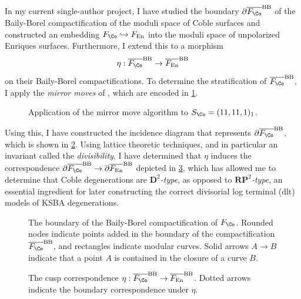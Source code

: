 \documentclass{amsart}
\begin{document}
\begin{remark}

In my current single-author project, I have studied the boundary \(\partial \overline{ F_{\Co} }^{\operatorname{BB}}\) of the Baily-Borel compactification of the moduli space of Coble surfaces and constructed an embedding \(F_{\Co}\hookrightarrow F_{\operatorname{En}}\) into the moduli space of unpolarized Enriques surfaces. Furthermore, I extend this to a morphism \[
\eta: \overline{ F_{\Co} }^{\operatorname{BB}} \to \overline{ F_{\operatorname{En}} }^{\operatorname{BB}}
\] on their Baily-Borel compactifications. To determine the stratification of \(\overline{ F_{\Co} }^{\operatorname{BB}}\), I apply the \emph{mirror moves} of \cite{AE22}, which are encoded in \cref{fig:mirror-moves-coble-simplified-tikz}.

\begin{figure}[H]
\centering

\caption{Application of the mirror move algorithm to $S_{\Co} = (11, 11, 1)_1$.}
\label{fig:mirror-moves-coble-simplified-tikz}
\end{figure}

Using this, I have constructed the incidence diagram that represents \(\partial \overline{ F_{\Co} }^{\operatorname{BB}}\), which is shown in \cref{fig:coble-cusp-diagram-detailed}. Using lattice theoretic techniques, and in particular an invariant called the \emph{divisibility}, I have determined that \(\eta\) induces the correspondence \(\partial \overline{ F_{\Co} }^{\operatorname{BB}}\to \partial \overline{ F_{\operatorname{En}} }^{\operatorname{BB}}\) depicted in \cref{fig:enriques-coble-correspondence}, which has allowed me to determine that Coble degenerations are \emph{\(\mathbf{D}^2\)-type}, as opposed to \emph{\({\mathbf{RP}}^2\)-type}, an essential ingredient for later constructing the correct divisorial log terminal (dlt) models of KSBA degenerations.

\begin{figure}[H]
\centering

\caption{The boundary of the Baily-Borel compactification of $F_{\Co}$. Rounded nodes indicate points added in the boundary of the compactification $\overline{ F_{\Co} }^{\operatorname{BB}}$, and rectangles indicate modular curves. Solid arrows $A\to B$ indicate that a point $A$ is contained in the closure of a curve $B$.}
\label{fig:coble-cusp-diagram-detailed}
\end{figure}

\begin{figure}[H]
\centering

\caption{The cusp correspondence $\eta: \overline{  F_{\Co} }^{\operatorname{BB}} \to \overline{  F_{\operatorname{En}}  }^{\operatorname{BB}}$. Dotted arrows indicate the boundary correspondence under $\eta$.}
\label{fig:enriques-coble-correspondence}
\end{figure}

\end{remark}
\end{document}
